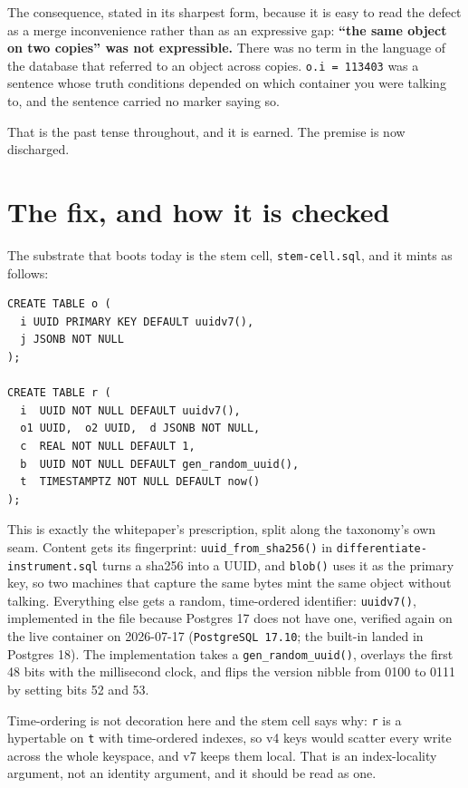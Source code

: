 The consequence, stated in its sharpest form, because it is easy to read the defect as a merge inconvenience rather than as an expressive gap: \textbf{``the same object on two copies'' was not expressible.} There was no term in the language of the database that referred to an object across copies. \texttt{o.i = 113403} was a sentence whose truth conditions depended on which container you were talking to, and the sentence carried no marker saying so.

That is the past tense throughout, and it is earned. The premise is now discharged.

\section{The fix, and how it is checked}

The substrate that boots today is the stem cell, \texttt{stem-cell.sql}, and it mints as follows:

\begin{lstlisting}
CREATE TABLE o (
  i UUID PRIMARY KEY DEFAULT uuidv7(),
  j JSONB NOT NULL
);

CREATE TABLE r (
  i  UUID NOT NULL DEFAULT uuidv7(),
  o1 UUID,  o2 UUID,  d JSONB NOT NULL,
  c  REAL NOT NULL DEFAULT 1,
  b  UUID NOT NULL DEFAULT gen_random_uuid(),
  t  TIMESTAMPTZ NOT NULL DEFAULT now()
);
\end{lstlisting}

This is exactly the whitepaper's prescription, split along the taxonomy's own seam. Content gets its fingerprint: \texttt{uuid\_from\_sha256()} in \texttt{differentiate-instrument.sql} turns a sha256 into a UUID, and \texttt{blob()} uses it as the primary key, so two machines that capture the same bytes mint the same object without talking. Everything else gets a random, time-ordered identifier: \texttt{uuidv7()}, implemented in the file because Postgres 17 does not have one, verified again on the live container on 2026-07-17 (\texttt{PostgreSQL 17.10}; the built-in landed in Postgres 18). The implementation takes a \texttt{gen\_random\_uuid()}, overlays the first 48 bits with the millisecond clock, and flips the version nibble from 0100 to 0111 by setting bits 52 and 53.

Time-ordering is not decoration here and the stem cell says why: \texttt{r} is a hypertable on \texttt{t} with time-ordered indexes, so v4 keys would scatter every write across the whole keyspace, and v7 keeps them local. That is an index-locality argument, not an identity argument, and it should be read as one.

